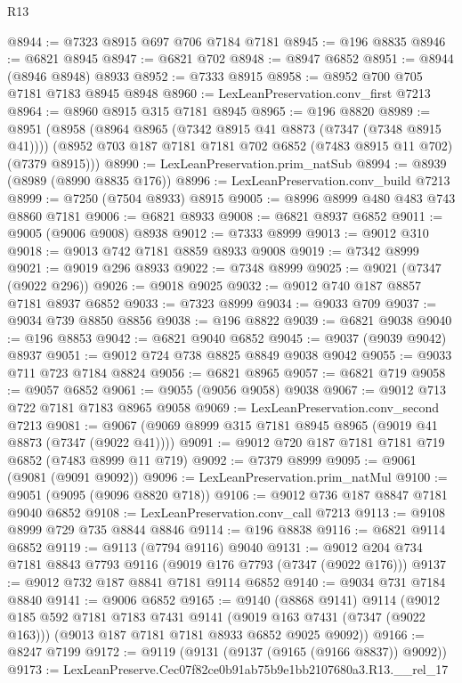 \begin{lexlean}{R13}
\begin{coremodule}
@8944 := @7323 @8915 @697 @706 @7184 @7181
@8945 := @196 @8835
@8946 := @6821 @8945
@8947 := @6821 @702
@8948 := @8947 @6852
@8951 := @8944 (@8946 @8948) @8933
@8952 := @7333 @8915
@8958 := @8952 @700 @705 @7181 @7183 @8945 @8948
@8960 := LexLeanPreservation.conv_first @7213
@8964 := @8960 @8915 @315 @7181 @8945
@8965 := @196 @8820
@8989 := @8951
    (@8958
      (@8964 @8965 (@7342 @8915 @41 @8873 (@7347 (@7348 @8915 @41))))
      (@8952 @703 @187 @7181 @7181 @702 @6852 (@7483 @8915 @11 @702) (@7379 @8915)))
@8990 := LexLeanPreservation.prim_natSub
@8994 := @8939 (@8989 (@8990 @8835 @176))
@8996 := LexLeanPreservation.conv_build @7213
@8999 := @7250 (@7504 @8933) @8915
@9005 := @8996 @8999 @480 @483 @743 @8860 @7181
@9006 := @6821 @8933
@9008 := @6821 @8937 @6852
@9011 := @9005 (@9006 @9008) @8938
@9012 := @7333 @8999
@9013 := @9012 @310
@9018 := @9013 @742 @7181 @8859 @8933 @9008
@9019 := @7342 @8999
@9021 := @9019 @296 @8933
@9022 := @7348 @8999
@9025 := @9021 (@7347 (@9022 @296))
@9026 := @9018 @9025
@9032 := @9012 @740 @187 @8857 @7181 @8937 @6852
@9033 := @7323 @8999
@9034 := @9033 @709
@9037 := @9034 @739 @8850 @8856
@9038 := @196 @8822
@9039 := @6821 @9038
@9040 := @196 @8853
@9042 := @6821 @9040 @6852
@9045 := @9037 (@9039 @9042) @8937
@9051 := @9012 @724 @738 @8825 @8849 @9038 @9042
@9055 := @9033 @711 @723 @7184 @8824
@9056 := @6821 @8965
@9057 := @6821 @719
@9058 := @9057 @6852
@9061 := @9055 (@9056 @9058) @9038
@9067 := @9012 @713 @722 @7181 @7183 @8965 @9058
@9069 := LexLeanPreservation.conv_second @7213
@9081 := @9067 (@9069 @8999 @315 @7181 @8945 @8965 (@9019 @41 @8873 (@7347 (@9022 @41))))
@9091 := @9012 @720 @187 @7181 @7181 @719 @6852 (@7483 @8999 @11 @719)
@9092 := @7379 @8999
@9095 := @9061 (@9081 (@9091 @9092))
@9096 := LexLeanPreservation.prim_natMul
@9100 := @9051 (@9095 (@9096 @8820 @718))
@9106 := @9012 @736 @187 @8847 @7181 @9040 @6852
@9108 := LexLeanPreservation.conv_call @7213
@9113 := @9108 @8999 @729 @735 @8844 @8846
@9114 := @196 @8838
@9116 := @6821 @9114 @6852
@9119 := @9113 (@7794 @9116) @9040
@9131 := @9012 @204 @734 @7181 @8843 @7793 @9116 (@9019 @176 @7793 (@7347 (@9022 @176)))
@9137 := @9012 @732 @187 @8841 @7181 @9114 @6852
@9140 := @9034 @731 @7184 @8840
@9141 := @9006 @6852
@9165 := @9140
    (@8868 @9141)
    @9114
    (@9012
      @185
      @592
      @7181
      @7183
      @7431
      @9141
      (@9019 @163 @7431 (@7347 (@9022 @163)))
      (@9013 @187 @7181 @7181 @8933 @6852 @9025 @9092))
@9166 := @8247 @7199
@9172 := @9119 (@9131 (@9137 (@9165 (@9166 @8837)) @9092))
@9173 := LexLeanPreserve.Cec07f82ce0b91ab75b9e1bb2107680a3.R13.__rel_17

\end{coremodule}
\end{lexlean}
